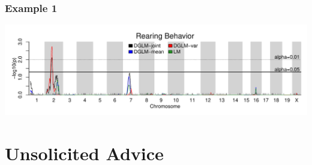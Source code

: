 \documentclass{beamer}
\begin{document}

\begin{frame}\frametitle{Example 1}

    \begin{center}
        \includegraphics[width = \textwidth]{manufig_rearing}
    \end{center}
    
\end{frame}


\section{Unsolicited Advice}
\end{document}
